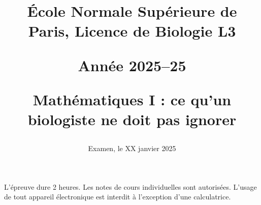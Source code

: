 \documentclass[french, 9pt]{article}
\title{\normalsize{\sc École Normale Supérieure de Paris, Licence de Biologie L3}
  
  \bigskip
  \normalsize{\sc Année 2025–25}
  
  \bigskip
  \large{\bf Mathématiques I : ce qu’un biologiste ne doit pas ignorer} 
  
}
\date{Examen, le XX janvier 2025}
\newcommand{\alglin}{/home/robin/ENSEIGN/Cours/MathBiologie/L3-ENS-Math1/Exercices/AlgLin}
\newcommand{\multivar}{/home/robin/ENSEIGN/Cours/MathBiologie/L3-ENS-Math1/Exercices/MultiVar}
\newcommand{\equadiff}{/home/robin/ENSEIGN/Cours/MathBiologie/L3-ENS-Math1/Exercices/EquaDiff}
\newcommand{\probas}{/home/robin/ENSEIGN/Cours/MathBiologie/L3-ENS-Math1/Exercices/Probas}
\begin{document}

\maketitle

\bigskip
L'épreuve dure 2 heures. 
Les notes de cours individuelles sont autorisées.
L’usage de tout appareil électronique est interdit à l’exception d’une calculatrice.



% 

\bigskip \bigskip 


\bigskip \bigskip 
% 


\end{document}
